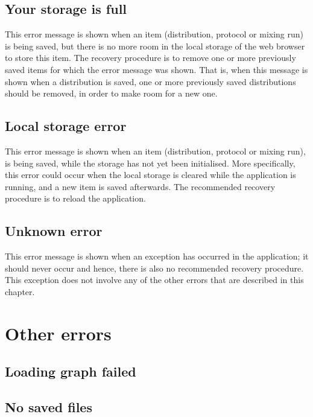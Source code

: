 \subsection{Your storage is full}
This error message is shown when an item (distribution, protocol or mixing run) is being saved, but there is no more room in the local storage of the web browser to store this item. The recovery procedure is to remove one or more previously saved items for which the error message was shown. That is, when this message is shown when a distribution is saved, one or more previously saved distributions should be removed, in order to make room for a new one.

\subsection{Local storage error}
This error message is shown when an item (distribution, protocol or mixing run), is being saved, while the storage has not yet been initialised. More specifically, this error could occur when the local storage is cleared while the application is running, and a new item is saved afterwards. The recommended recovery procedure is to reload the application. 

\subsection{Unknown error}
This error message is shown when an exception has occurred in the application; it should never occur and hence, there is also no recommended recovery procedure. This exception does not involve any of the other errors that are described in this chapter.

\section{Other errors}

\subsection{Loading graph failed}

\subsection{No saved files}


